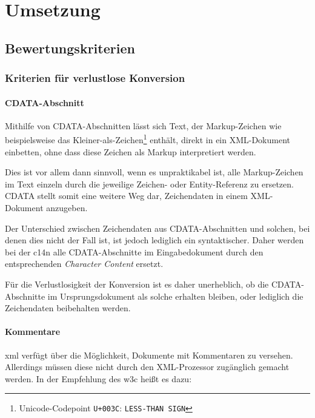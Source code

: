 \chapter{Umsetzung}
\label{chap:impl}

\section{Bewertungskriterien}

\subsection{Kriterien für verlustlose Konversion}

\subsubsection{CDATA-Abschnitt}

Mithilfe von CDATA-Abschnitten lässt sich Text, der Markup-Zeichen wie beispielsweise das Kleiner-als-Zeichen\footnote{Unicode-Codepoint \texttt{U+003C}: \texttt{LESS-THAN SIGN}} enthält, direkt in ein XML-Dokument einbetten, ohne dass diese Zeichen als Markup interpretiert werden.

Dies ist vor allem dann sinnvoll, wenn es unpraktikabel ist, alle Markup-Zeichen im Text einzeln durch die jeweilige Zeichen- oder Entity-Referenz zu ersetzen. CDATA stellt somit eine weitere Weg dar, Zeichendaten in einem XML-Dokument anzugeben.\cite[Abschnitt~2.4]{maler2008xml}

Der Unterschied zwischen Zeichendaten aus CDATA-Abschnitten und solchen, bei denen dies nicht der Fall ist, ist jedoch lediglich ein syntaktischer. Daher werden bei der \acrlong{c14n} alle CDATA-Abschnitte im Eingabedokument durch den entsprechenden \emph{Character Content} ersetzt\cite[Abschnitt~2.1]{boyer2001c14n}.

Für die Verlustlosigkeit der Konversion ist es daher unerheblich, ob die CDATA-Abschnitte im Ursprungsdokument als solche erhalten bleiben, oder lediglich die Zeichendaten beibehalten werden.

\subsubsection{Kommentare}

\acrshort{xml} verfügt über die Möglichkeit, Dokumente mit Kommentaren zu versehen. Allerdings müssen diese nicht durch den XML-Prozessor zugänglich gemacht werden. In der Empfehlung des \gls{w3c} heißt es dazu:

